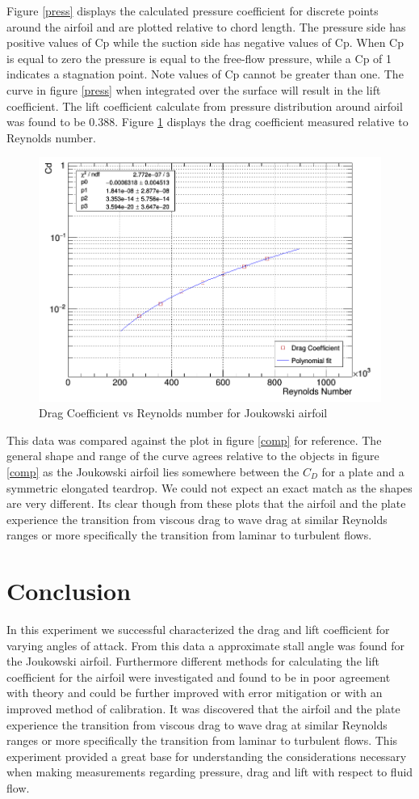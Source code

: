 \documentclass[paper=a4, fontsize=11pt, abstract=on]{scrartcl}
\numberwithin{equation}{section}		%
\numberwithin{figure}{section}			%
\numberwithin{table}{section}				%
\begin{document}
Figure \ref{press} displays the calculated pressure coefficient for discrete points around the airfoil and are plotted relative to chord length. The pressure side has positive values of Cp while the suction side has negative values of Cp. When Cp is equal to zero the pressure is equal to the free-flow pressure, while a Cp of 1 indicates a stagnation point. Note values of Cp cannot be greater than one. The curve in figure \ref{press} when integrated over the surface will result in the lift coefficient. The lift coefficient calculate from pressure distribution around airfoil was found to be 0.388.
Figure \ref{re} displays the drag coefficient measured relative to Reynolds number. 


\begin{figure}[H]
\centering
\includegraphics[width=0.7\linewidth]{r1}
\caption{Drag Coefficient vs Reynolds number for Joukowski airfoil}
\label{re}
\end{figure}
This data was compared against the plot in figure \ref{comp} for reference. The general shape and range of the curve agrees relative to the objects in figure \ref{comp} as the Joukowski airfoil lies somewhere between the $C_D$ for a plate and a symmetric elongated teardrop. We could not expect an exact match as the shapes are very different. Its clear though from these plots that the airfoil and the plate experience the transition from viscous drag to wave drag at similar Reynolds ranges or more specifically the transition from laminar to turbulent flows.

\section{Conclusion}
In this experiment we successful characterized the drag and lift coefficient for varying angles of attack. From this data a approximate stall angle was found for the Joukowski airfoil. Furthermore different methods for calculating the lift coefficient for the airfoil were investigated and found to be in poor agreement with theory and could be further improved with error mitigation or with an improved method of calibration. It was discovered that the airfoil and the plate experience the transition from viscous drag to wave drag at similar Reynolds ranges or more specifically the transition from laminar to turbulent flows. This experiment provided a great base for understanding the considerations necessary when making measurements regarding pressure, drag and lift with respect to fluid flow.
\end{document}
